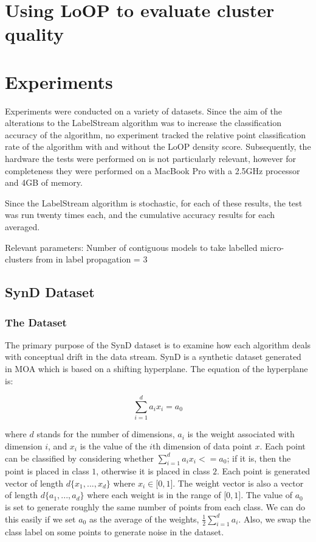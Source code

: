 \documentclass[12pt,a4paper,oneside]{report}
\begin{document}
\section{Using LoOP to evaluate cluster quality}
\section{Experiments}
Experiments were conducted on a variety of datasets. Since the aim of the alterations to the LabelStream algorithm was to increase the classification accuracy of the algorithm, no experiment tracked the relative point classification rate of the algorithm with and without the LoOP density score. Subsequently, the hardware the tests were performed on is not particularly relevant, however for completeness they were performed on a MacBook Pro with a 2.5GHz processor and 4GB of memory. 

Since the LabelStream algorithm is stochastic, for each of these results, the test was run twenty times each, and the cumulative accuracy results for each averaged. 

Relevant parameters:
Number of contiguous models to take labelled micro-clusters from in label propagation = $3$

\subsection{SynD Dataset}

\subsubsection{The Dataset}
The primary purpose of the SynD dataset is to examine how each algorithm deals with conceptual drift in the data stream. SynD is a synthetic dataset generated in MOA which is based on a shifting hyperplane. The equation of the hyperplane is:

\[  \sum_{i = 1}^d a_i x_i = a_0 \]

where \(d\) stands for the number of dimensions, \( a_i \) is the weight associated with dimension \(i\),  and \(x_i\) is the value of the \(i\)th dimension of data point \(x\). Each point can be classified by considering whether  \(  \sum_{i = 1}^d a_i x_i <= a_0 \); if it is, then the point is placed in class \(1\), otherwise it is placed in class \(2\). Each point is generated vector of length \( d  \lbrace x_1,...,x_d  \rbrace \) where \( x_i  \in \lbrack  0,1 \rbrack \).  The weight vector is also a vector of length \( d  \lbrace a_1,...,a_d  \rbrace \) where each weight is in the range of \( \lbrack 0,1 \rbrack \).  The value of \( a_0 \) is set to generate roughly the same number of points from each class. We can do this easily if we set \(a_0\) as the average of the weights, \( \frac{1}{2} \sum_{i=1}^d a_i\). Also, we swap the class label on some points to generate noise in the dataset. 
\end{document}
